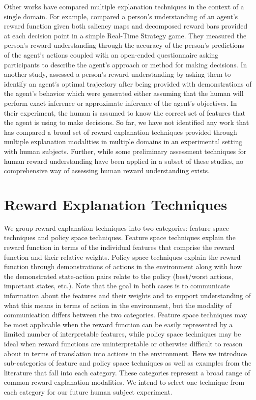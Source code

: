 \documentclass[letterpaper]{article} %
\begin{document}
Other works have compared multiple explanation techniques in the context of a single domain. For example, \citet{anderson2019explaining} compared a person's understanding of an agent's reward function given both saliency maps and decomposed reward bars provided at each decision point in a simple Real-Time Strategy game. They measured the person's reward understanding through the accuracy of the person's predictions of the agent's actions coupled with an open-ended questionnaire asking participants to describe the agent's approach or method for making decisions. In another study, \citet{huang2019enabling} assessed a person's reward understanding by asking them to identify an agent's optimal trajectory after being provided with demonstrations of the agent's behavior which were generated either assuming that the human will perform exact inference or approximate inference of the agent's objectives. In their experiment, the human is assumed to know the correct set of features that the agent is using to make decisions. So far, we have not identified any work that has compared a broad set of reward explanation techniques provided through multiple explanation modalities in multiple domains in an experimental setting with human subjects. Further, while some preliminary assessment techniques for human reward understanding have been applied in a subset of these studies, no comprehensive way of assessing human reward understanding exists.


\section{Reward Explanation Techniques}
\label{xaitechniques}
We group reward explanation techniques into two categories: feature space techniques and policy space techniques. Feature space techniques explain the reward function in terms of the individual features that comprise the reward function and their relative weights. Policy space techniques explain the reward function through demonstrations of actions in the environment along with how the demonstrated state-action pairs relate to the policy (best/worst actions, important states, etc.). Note that the goal in both cases is to communicate information about the features and their weights and to support understanding of what this means in terms of action in the environment, but the modality of communication differs between the two categories. Feature space techniques may be most applicable when the reward function can be easily represented by a limited number of interpretable features, while policy space techniques may be ideal when reward functions are uninterpretable or otherwise difficult to reason about in terms of translation into actions in the environment. Here we introduce sub-categories of feature and policy space techniques as well as examples from the literature that fall into each category. These categories represent a broad range of common reward explanation modalities. We intend to select one technique from each category for our future human subject experiment.
\end{document}
